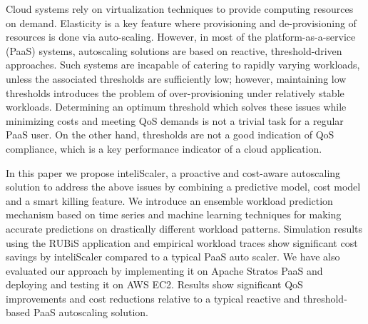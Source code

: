 Cloud systems rely on virtualization techniques to provide computing resources on demand. Elasticity is a key feature where provisioning and de-provisioning of resources is done via auto-scaling. However, in most of the platform-as-a-service (PaaS) systems, autoscaling solutions are based on reactive, threshold-driven approaches. Such systems are incapable of catering to rapidly varying workloads, unless the associated thresholds are sufficiently low; however, maintaining low thresholds introduces the problem of over-provisioning under relatively stable workloads. Determining an optimum threshold which solves these issues while minimizing costs and meeting QoS demands is not a trivial task for a regular PaaS user. On the other hand, thresholds are not a good indication of QoS compliance, which is a key performance indicator of a cloud application.

In this paper we propose inteliScaler, a proactive and cost-aware autoscaling solution to address the above issues by combining a predictive model, cost model and a smart killing feature. We introduce an ensemble workload prediction mechanism based on time series and machine learning techniques for making accurate predictions on drastically different workload patterns. Simulation results using the RUBiS application and empirical workload traces show significant cost savings by inteliScaler compared to a typical PaaS auto scaler. We have also evaluated our approach by implementing it on Apache Stratos PaaS and deploying and testing it on AWS EC2. Results show significant QoS improvements and cost reductions relative to a typical reactive and threshold-based PaaS autoscaling solution.